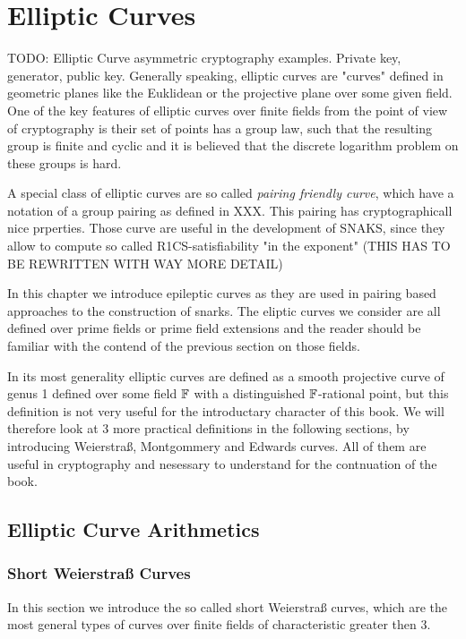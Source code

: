 \chapter{Elliptic Curves}
TODO: Elliptic Curve asymmetric cryptography examples. Private key, generator, public key. 
Generally speaking, elliptic curves are "curves" defined in geometric planes like the Euklidean or the projective plane over some given field. One of the key features of elliptic curves over finite fields from the point of view of cryptography is their set of points has a group law, such that the resulting group is finite and cyclic and it is believed that the discrete logarithm problem on these groups is hard. 

A special class of elliptic curves are so called \textit{pairing friendly curve}, which have a notation of a group pairing as defined in XXX. This pairing has cryptographicall nice prperties. Those curve are useful in the development of SNAKS, since they allow to compute so called R1CS-satisfiability "in the exponent" (THIS HAS TO BE REWRITTEN WITH WAY MORE DETAIL)

In this chapter we introduce epileptic curves as they are used in pairing based approaches to the construction of snarks. The eliptic curves we consider are all defined over prime fields or prime field extensions and the reader should be familiar with the contend of the previous section on those fields.

In its most generality elliptic curves are defined as a smooth projective curve of genus 1 defined over some field $\mathbb{F}$ with a distinguished $\mathbb{F}$-rational point, but this definition is not very useful for the introductary character of this book. We will therefore look at $3$ more practical definitions in the following sections, by introducing Weierstraß, Montgommery and Edwards curves. All of them are useful in cryptography and nesessary to understand for the contnuation of the book.

\section{Elliptic Curve Arithmetics}

\subsection{Short Weierstraß Curves}
In this section we introduce the so called short Weierstraß curves, which are the most general types of curves over finite fields of characteristic greater then $3$. 

